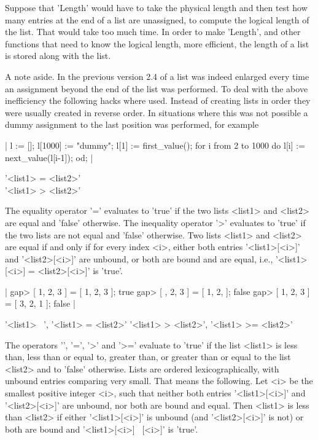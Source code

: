 Suppose that 'Length' would  have to take   the physical length and  then
test how many entries at the end of a list are unassigned, to compute the
logical length of the list.  That would take  too much time.  In order to
make 'Length', and other functions that need to  know the logical length,
more efficient, the length of a list is stored along with the list.

A  note aside.  In the previous  version 2.4 of {\GAP} a  list was indeed
enlarged   every time  an assignment beyond   the  end  of  the list  was
performed.  To deal with the above inefficiency the following hacks where
used.  Instead of creating  lists in order they  were usually  created in
reverse   order.   In situations   where this  was  not  possible a dummy
assignment to the last position was performed, for example

|    l := [];
    l[1000] := "dummy";
    l[1] := first_value();
    for i  from 2  to 1000  do l[i] := next_value(l[i-1]);  od; |

%

'<list1> = <list2>' \\
'<list1> \<> <list2>'

The equality operator '=' evaluates  to 'true' if  the two lists  <list1>
and <list2> are  equal and  'false'  otherwise.  The inequality  operator
'\<>'  evaluates to 'true'  if the  two lists are   not equal and 'false'
otherwise.  Two  lists <list1> and <list2> are  equal if  and only if for
every index  <i>, either  both entries '<list1>[<i>]'  and '<list2>[<i>]'
are unbound, or   both are bound and  are  equal,  i.e., '<list1>[<i>]  =
<list2>[<i>]' is 'true'.

|    gap> [ 1, 2, 3 ] = [ 1, 2, 3 ];
    true
    gap> [ , 2, 3 ] = [ 1, 2, ];
    false
    gap> [ 1, 2, 3 ] = [ 3, 2, 1 ];
    false |

'<list1> \<\ <list2>', '<list1> \<= <list2>'
'<list1>  > <list2>', '<list1>  >= <list2>'

The operators  '\<',  '\<=', '>' and '>='  evaluate to 'true' if the list
<list1> is  less than,  less  than or equal  to, greater than, or greater
than or equal to the  list <list2> and  to 'false' otherwise.   Lists are
ordered lexicographically,  with  unbound  entries comparing very  small.
That means the following.  Let <i> be the smallest positive integer  <i>,
such that  neither  both entries  '<list1>[<i>]'  and  '<list2>[<i>]' are
unbound, nor both are bound and equal.  Then <list1> is less than <list2>
if  either '<list1>[<i>]' is unbound (and  '<list2>[<i>]' is not) or both
are bound and '<list1>[<i>] \<\ <list2>[<i>]' is 'true'.

